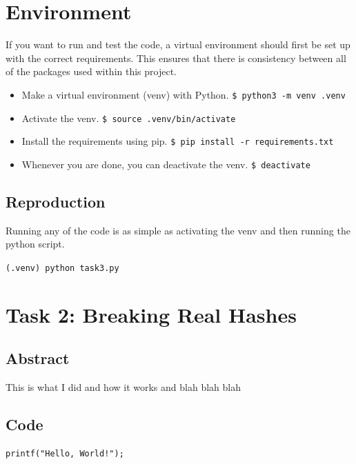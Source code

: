 \documentclass[11pt]{article}
\begin{document}
\section*{Environment}

If you want to run and test the code, a virtual environment should first be set up with the correct requirements. This ensures that there is consistency between all of the packages used within this project.

\begin{itemize}
	\item Make a virtual environment (venv) with Python.
		\verb|$ python3 -m venv .venv|
	\item Activate the venv.
		\verb|$ source .venv/bin/activate|
	\item Install the requirements using pip.
		\verb|$ pip install -r requirements.txt|
	\item Whenever you are done, you can deactivate the venv.
		\verb|$ deactivate|
\end{itemize}

\subsection*{Reproduction}

Running any of the code is as simple as activating the venv and then running the python script.

\verb|(.venv) python task3.py|

\section*{Task 2: Breaking Real Hashes}
\subsection*{Abstract}

This is what I did and how it works and blah blah blah

\subsection*{Code}

\begin{lstlisting}
printf("Hello, World!");
\end{lstlisting}

\end{document}
